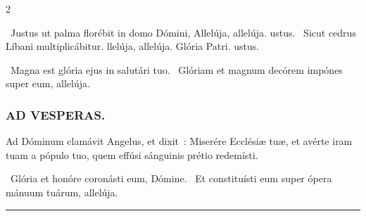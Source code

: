 \documentclass[9pt,twoside]{extarticle}
\begin{document}
\begin{multicols}{2}
{\begin{tightlist}{}
\item {}~Justus ut palma florébit in domo Dómini, \textred{*} Allelúja, allelúja. ustus.
~Sicut cedrus Líbani multiplicábitur. llelúja, allelúja.
Glória Patri. ustus.
\item {}~Magna est glória ejus in salutári tuo. ~Glóriam et magnum decórem impónes super eum, allelúja.
\end{tightlist}

\subsubsection*{\center \textsc{AD VESPERAS.}}
\begin{tightlist}{}
\item {}
\item {} Ad Dóminum clamávit Angelus, et dixit~: Miserére Ecclésiæ tuæ, et avérte iram tuam a pópulo tuo, quem effúsi sánguinis prétio redemísti.
\item {}~Glória et honóre coronásti eum, Dómine. ~Et constituísti eum super ópera mánuum tuárum, allelúja.
\item {}
\end{tightlist}


\begin{center}\textcolor{red}{\rule{\linewidth}{0.5pt}} \end{center}



\clearpage

\section*{\center \textsc{}}
\subsection*{\center \textsc{}}
}
\end{multicols}
\end{document}
